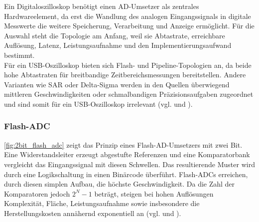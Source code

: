 \documentclass[a4paper, portrait, 12pt]{scrartcl} %
\begin{document}
Ein Digitaloszilloskop benötigt einen AD-Umsetzer als zentrales Hardwareelement, da erst die Wandlung des analogen Eingangssignals in digitale Messwerte die weitere Speicherung, Verarbeitung und Anzeige ermöglicht. Für die Auswahl steht die Topologie am Anfang, weil sie Abtastrate, erreichbare Auflösung, Latenz, Leistungsaufnahme und den Implementierungsaufwand bestimmt.\\

Für ein USB-Oszilloskop bieten sich Flash- und Pipeline-Topologien an, da beide hohe Abtastraten für breitbandige Zeitbereichsmessungen bereitstellen. Andere Varianten wie SAR oder Delta-Sigma werden in den Quellen überwiegend mittleren Geschwindigkeiten oder schmalbandigen Präzisionsaufgaben zugeordnet und sind somit für ein USB-Oszilloskop irrelevant (vgl. \cite{MPS} und \cite{AnalogDevices2001a}).\\

\subsubsection{Flash-ADC}
\autoref{fig:2bit_flash_adc} zeigt das Prinzip eines Flash-AD-Umsetzers mit zwei Bit. Eine Widerstandsleiter erzeugt abgestufte Referenzen und eine Komparatorbank vergleicht das Eingangssignal mit diesen Schwellen. Das resultierende Muster wird durch eine Logikschaltung in einen Binärcode überführt. Flash-ADCs erreichen, durch diesen simplen Aufbau, die höchste Geschwindigkeit. Da die Zahl der Komparatoren jedoch $2^N-1$ beträgt, steigen bei hohen Auflösungen Komplexität, Fläche, Leistungsaufnahme sowie insbesondere die Herstellungskosten annähernd exponentiell an (vgl. \cite{MPS} und \cite{AnalogDevices2001b}).
\end{document}
